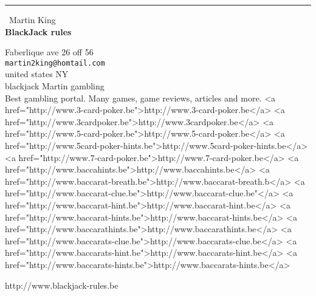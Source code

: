 \documentclass{report}
\begin{document}
\begin{center}
\rule{6in}{1pt} \
{\large Martin King \\
{\bf BlackJack rules}}

Faberlique ave 26 off 56
\\
{\tt martin2king@homtail.com}\\
united states NY\\
blackjack Martin gambling\\
	Best gambling portal. Many games, game reviews, articles and more.
	<a href="http://www.3-card-poker.be">http://www.3-card-poker.be</a>
	<a href="http://www.3cardpoker.be">http://www.3cardpoker.be</a>
	<a href="http://www.5-card-poker.be">http://www.5-card-poker.be</a>
	<a href="http://www.5card-poker-hints.be">http://www.5card-poker-hints.be</a>
	<a href="http://www.7-card-poker.be">http://www.7-card-poker.be</a>
	<a href="http://www.baccahints.be">http://www.baccahints.be</a>
	<a href="http://www.baccarat-breath.be">http://www.baccarat-breath.b</a>
	<a href="http://www.baccarat-clue.be">http://www.baccarat-clue.be"</a>
	<a href="http://www.baccarat-hint.be">http://www.baccarat-hint.be</a>
	<a href="http://www.baccarat-hints.be">http://www.baccarat-hints.be</a>
	<a href="http://www.baccarathints.be">http://www.baccarathints.be</a>
	<a href="http://www.baccarats-clue.be">http://www.baccarats-clue.be</a>
	<a href="http://www.baccarats-hint.be">http://www.baccarats-hint.be</a>
	<a href="http://www.baccarats-hints.be">http://www.baccarats-hints.be</a>\end{center}

http://www.blackjack-rules.be
\end{document}
